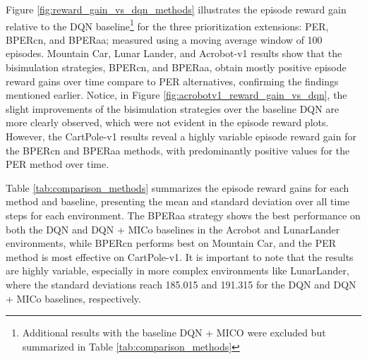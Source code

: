Figure \ref{fig:reward_gain_vs_dqn_methods} illustrates the episode reward gain relative to the DQN baseline\footnote{Additional results with the baseline DQN + MICO were excluded but summarized in Table \ref{tab:comparison_methods}} for the three prioritization extensions: PER, BPERcn, and BPERaa; measured using a moving average window of 100 episodes. Mountain Car, Lunar Lander, and Acrobot-v1 results show that the bisimulation strategies, BPERcn, and BPERaa, obtain mostly positive episode reward gains over time compare to PER alternatives, confirming the findings mentioned earlier. Notice, in Figure \ref{fig:acrobotv1_reward_gain_vs_dqn}, the slight improvements of the bisimulation strategies over the baseline DQN are more clearly observed, which were not evident in the episode reward plots. However, the CartPole-v1 results reveal a highly variable episode reward gain for the BPERcn and BPERaa methods, with predominantly positive values for the PER method over time. %

Table \ref{tab:comparison_methods} summarizes the episode reward gains for each method and baseline, presenting the mean and standard deviation over all time steps for each environment. The BPERaa strategy shows the best performance on both the DQN and DQN + MICo baselines in the Acrobot and LunarLander environments, while BPERcn performs best on Mountain Car, and the PER method is most effective on CartPole-v1. It is important to note that the results are highly variable, especially in more complex environments like LunarLander, where the standard deviations reach 185.015 and 191.315 for the DQN and DQN + MICo baselines, respectively. %






